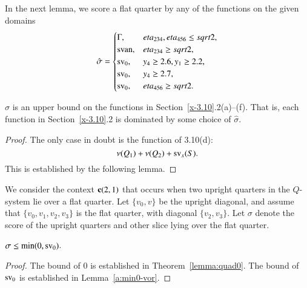 In the next lemma, we score a flat quarter by any of the functions
on the given domains
     $$\hat\sigma=
        \begin{cases}
            \Gamma,& eta_{234},eta_{456}\le sqrt2,\\
             {\operatorname{svan}}, &eta_{234}\ge sqrt2,\\
            {\operatorname{sv}}_0, & y_4\ge 2.6, y_1\ge2.2,\\
            {\operatorname{sv}}_0, & y_4\ge 2.7,\\
            {\operatorname{sv}}_0,& eta_{456}\ge sqrt2.
        \end{cases}
    $$

\begin{lemma}
    \label{lemma:hatsigma}
$\hat\sigma$ is an upper bound on the functions in
Section~\ref{x-3.10}.2(a)--(f). That is, each function in
Section~\ref{x-3.10}.2 is dominated by some choice of $\hat\sigma$.
\end{lemma}

\begin{proof}  The only case in doubt is the function of 3.10(d):
$$\nu(Q_1)+\nu(Q_2)+{\operatorname{sv}}_x(S).$$ This is established by the
following lemma.
\end{proof}


We consider the context ${\operatorname{\bf c}}{(2,1)}$ that occurs when two upright
quarters in the $Q$-system lie over a flat quarter. Let $\{v_0,v\}$ be
the upright diagonal, and assume that $\{v_0,v_1,v_2,v_3\}$ is the
flat quarter, with diagonal $\{v_2,v_3\}$. Let $\sigma$ denote the
score of the upright quarters and other slice lying
over the flat quarter.

\begin{lemma}\label{lemma:min0-svor}
    $\sigma\le \min(0,{\operatorname{sv}}_0)$.
\end{lemma}

\begin{proof}
The bound of $0$ is established in Theorem~\ref{lemma:quad0}.
The bound of ${\operatorname{sv}}_0$ is established in Lemma~\ref{a:min0-vor}.
\end{proof}






